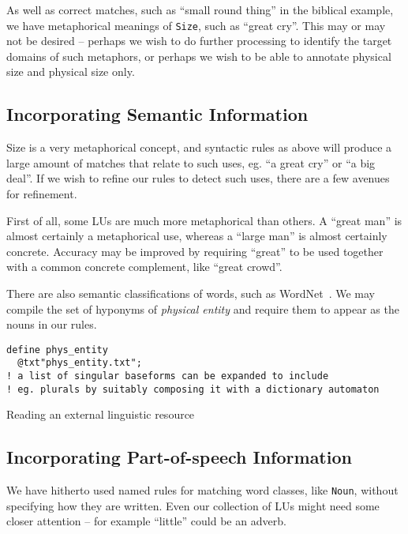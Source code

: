 \documentclass{llncs}
\begin{document}
As well as correct matches, such as ``small round thing'' in the biblical
example, we have metaphorical meanings of \verb+Size+, such as ``great cry''.
This may or may not be desired -- perhaps we wish to do further processing to
identify the target domains of such metaphors, or perhaps we wish to be able
to annotate physical size and physical size only.

\subsection{Incorporating Semantic Information}

Size is a very metaphorical concept, and syntactic rules as above will produce a large amount of matches that relate to such uses, eg. ``a great cry'' or ``a big deal''. If we wish to refine our rules to detect such uses, there are a few avenues for refinement.

First of all, some LUs are much more metaphorical than others. A ``great man'' is almost certainly a metaphorical use, whereas a ``large man'' is almost certainly concrete. Accuracy may be improved by requiring ``great'' to be used together with a common concrete complement, like ``great crowd''.

There are also semantic classifications of words, such as WordNet~\cite{wordnet}. We may compile the set of hyponyms of \emph{physical entity} and require them to appear as the nouns in our rules.

\begin{table}[h]
\small
\begin{framed}
\begin{verbatim}
define phys_entity
  @txt"phys_entity.txt";
! a list of singular baseforms can be expanded to include
! eg. plurals by suitably composing it with a dictionary automaton
\end{verbatim}
\end{framed}
\normalsize
\caption{Reading an external linguistic resource}
\end{table}

\subsection{Incorporating Part-of-speech Information}

We have hitherto used named rules for matching word classes, like \verb+Noun+,
without specifying how they are written. Even our collection of LUs might need
some closer attention -- for example ``little'' could be an adverb.
\end{document}
